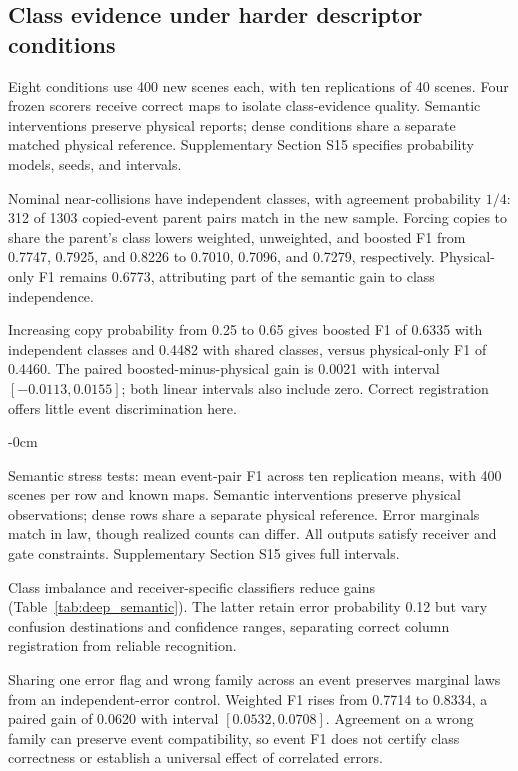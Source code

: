 \subsection{Class evidence under harder descriptor conditions}\label{sec:deep_semantic}
Eight conditions use 400 new scenes each, with ten replications of 40 scenes. Four frozen scorers receive correct maps to isolate class-evidence quality. Semantic interventions preserve physical reports; dense conditions share a separate matched physical reference. Supplementary Section S15 specifies probability models, seeds, and intervals.

Nominal near-collisions have independent classes, with agreement probability $1/4$: 312 of 1303 copied-event parent pairs match in the new sample. Forcing copies to share the parent's class lowers weighted, unweighted, and boosted F1 from 0.7747, 0.7925, and 0.8226 to 0.7010, 0.7096, and 0.7279, respectively. Physical-only F1 remains 0.6773, attributing part of the semantic gain to class independence.

Increasing copy probability from 0.25 to 0.65 gives boosted F1 of 0.6335 with independent classes and 0.4482 with shared classes, versus physical-only F1 of 0.4460. The paired boosted-minus-physical gain is 0.0021 with interval $[-0.0113,0.0155]$; both linear intervals also include zero. Correct registration offers little event discrimination here.

\begin{table}[!t]\begin{adjustwidth}{-\extralength}{0cm}
\caption{Semantic stress tests: mean event-pair F1 across ten replication means, with 400 scenes per row and known maps. Semantic interventions preserve physical observations; dense rows share a separate physical reference. Error marginals match in law, though realized counts can differ. All outputs satisfy receiver and gate constraints. Supplementary Section S15 gives full intervals.}\label{tab:deep_semantic}
\small\setlength{\tabcolsep}{4pt}
\end{adjustwidth}\end{table}

Class imbalance and receiver-specific classifiers reduce gains (Table~\ref{tab:deep_semantic}). The latter retain error probability 0.12 but vary confusion destinations and confidence ranges, separating correct column registration from reliable recognition.

Sharing one error flag and wrong family across an event preserves marginal laws from an independent-error control. Weighted F1 rises from 0.7714 to 0.8334, a paired gain of 0.0620 with interval $[0.0532,0.0708]$. Agreement on a wrong family can preserve event compatibility, so event F1 does not certify class correctness or establish a universal effect of correlated errors.
